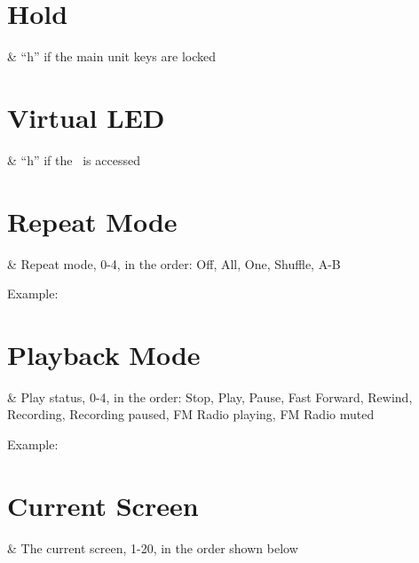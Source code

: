 \section{Hold}
    \begin{tagmap}
         & ``h'' if the main unit keys are locked\\
    \end{tagmap}

\section{Virtual LED}
  \begin{tagmap}
     & ``h'' if the \disk\ is accessed\\
  \end{tagmap}

\section{Repeat Mode}
  \begin{tagmap}
     & Repeat mode, 0-4, in the order: Off, All, One, Shuffle, A-B\\
  \end{tagmap}
Example: 

\section{Playback Mode}
  \begin{tagmap}
     & Play status, 0-4, in the order: Stop, Play, Pause,
           Fast Forward, Rewind, Recording, Recording paused, FM Radio playing,
           FM Radio muted\\
  \end{tagmap}
Example: 

\section{Current Screen}
  \begin{tagmap}
     & The current screen, 1-20, in the order shown below\\
  \end{tagmap}

